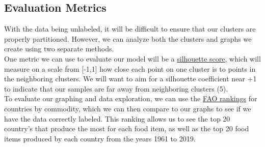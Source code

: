 \documentclass[12pt, a4paper]{article}
\begin{document}
\begin{spacing}{1.1}
	\section{Evaluation Metrics}
	With the data being unlabeled, it will be difficult to ensure that our clusters are properly partitioned. However, we can analyze both the clusters and graphs we create using two separate methods. \vspace*{2mm}\\
	One metric we can use to evaluate our model will be a \href{https://scikit-learn.org/stable/auto_examples/cluster/plot_kmeans_silhouette_analysis.html}{silhouette score}, which will measure on a scale from [-1,1] how close each point on one cluster is to points in the neighboring clusters. We will want to aim for a silhouette coefficient near +1 to indicate that our samples are far away from neighboring clusters (5). \vspace*{2mm}\\
	To evaluate our graphing and data exploration, we can use the \href{http://www.fao.org/faostat/en/#rankings/countries_by_commodity}{FAO rankings} for countries by commodity, which we can then compare to our graphs to see if we have the data correctly labeled. This ranking allows us to see the top 20 country's that produce the most for each food item, as well as the top 20 food items produced by each country from the years 1961 to 2019. \newpage
	
	

\end{spacing}
\end{document}
